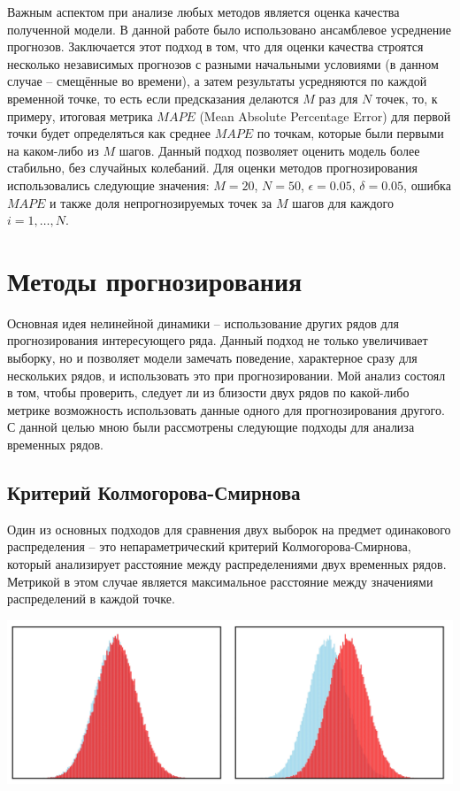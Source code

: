 \documentclass[a4paper, 12pt]{extarticle}
\begin{document}
Важным аспектом при анализе любых методов является оценка качества полученной модели. В данной работе было использовано ансамблевое усреднение прогнозов. Заключается этот подход в том, что для оценки качества строятся несколько независимых прогнозов с разными начальными условиями (в данном случае – смещённые во времени), а затем результаты усредняются по каждой временной точке, то есть если предсказания делаются $M$ раз для $N$ точек, то, к примеру, итоговая метрика $MAPE$ (Mean Absolute Percentage Error) для первой точки будет определяться как среднее $MAPE$ по точкам, которые были первыми на каком-либо из $M$ шагов. Данный подход позволяет оценить модель более стабильно, без случайных колебаний. Для оценки методов прогнозирования использовались следующие значения: $M=20$, $N=50$, $\epsilon=0.05$, $\delta=0.05$, ошибка $MAPE$ и также доля непрогнозируемых точек за $M$ шагов для каждого $i=1,\ldots,N$.

\newpage
\section{Методы прогнозирования}

Основная идея нелинейной динамики – использование других рядов для прогнозирования интересующего ряда. Данный подход не только увеличивает выборку, но и позволяет модели замечать поведение, характерное сразу для нескольких рядов, и использовать это при прогнозировании. Мой анализ состоял в том, чтобы проверить, следует ли из близости двух рядов по какой-либо метрике возможность использовать данные одного для прогнозирования другого. С данной целью мною были рассмотрены следующие подходы для анализа временных рядов.

\subsection{Критерий Колмогорова-Смирнова}

Один из основных подходов для сравнения двух выборок на предмет одинакового распределения – это непараметрический критерий Колмогорова-Смирнова, который анализирует расстояние между распределениями двух временных рядов. Метрикой в этом случае является максимальное расстояние между значениями распределений в каждой точке.

\begin{center}
    \includegraphics[width=\textwidth]{img/colmogorov-smirnov.png}
\end{center}
\end{document}
